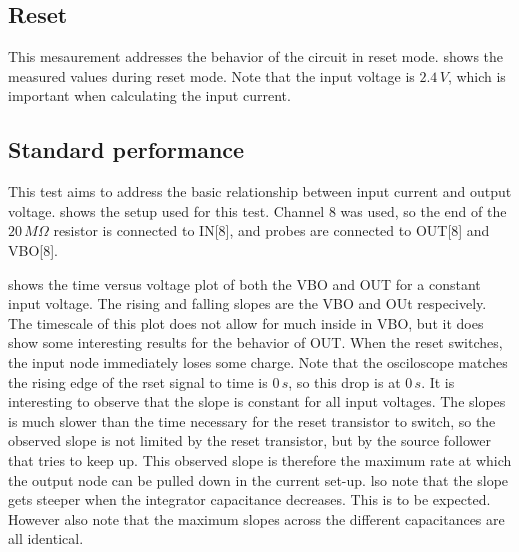 \documentclass{article}
\begin{document}
\subsection{Reset}
This mesaurement addresses the behavior of the circuit in reset mode.  shows the measured values during reset mode. Note that the input voltage is $2.4\,V$, which is important when calculating the input current. 








\clearpage
\subsection{Standard performance}
This test aims to address the basic relationship between input current and output voltage.  shows the setup used for this test. Channel 8 was used, so the end of the $20\,M\Omega$ resistor is connected to IN[8], and probes are connected to OUT[8] and VBO[8]. 



 shows the time versus voltage plot of both the VBO and OUT for a constant input voltage. The rising and falling slopes are the VBO and OUt respecively. The timescale of this plot does not allow for much inside in VBO, but it does show some interesting results for the behavior of OUT. When the reset switches, the input node immediately loses some charge. Note that the osciloscope matches the rising edge of the rset signal to time is $0\,s$, so this drop is at $0\,s$. It is interesting to observe that the slope is constant for all input voltages. The slopes is much slower than the time necessary for the reset transistor to switch, so the observed slope is not limited by the reset transistor, but by the source follower that tries to keep up. This observed slope is therefore the maximum rate at which the output node can be pulled down in the current set-up.  lso note that the slope gets steeper when the integrator capacitance decreases. This is to be expected. However also note that the maximum slopes across the different capacitances are all identical.
\end{document}
